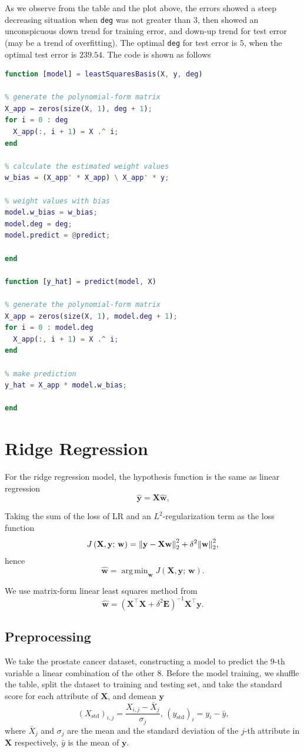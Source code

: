 \documentclass[10pt]{article}
\DeclareMathOperator*{\argmin}{arg\,min}
\begin{document}
As we observe from the table and the plot above, the errors showed a steep decreasing situation when \texttt{deg} was not greater than $3$, then showed an unconspicuous down trend for training error, and down-up trend for test error (may be a trend of overfitting). The optimal \texttt{deg} for test error is $5$, when the optimal test error is $239.54$. The code is shown as follows
\begin{lstlisting}[language=MATLAB]
function [model] = leastSquaresBasis(X, y, deg)

% generate the polynomial-form matrix
X_app = zeros(size(X, 1), deg + 1);
for i = 0 : deg
  X_app(:, i + 1) = X .^ i;
end

% calculate the estimated weight values
w_bias = (X_app' * X_app) \ X_app' * y;

% weight values with bias
model.w_bias = w_bias;
model.deg = deg;
model.predict = @predict;

end

function [y_hat] = predict(model, X)

% generate the polynomial-form matrix
X_app = zeros(size(X, 1), model.deg + 1);
for i = 0 : model.deg
  X_app(:, i + 1) = X .^ i;
end

% make prediction
y_hat = X_app * model.w_bias;

end
\end{lstlisting}
\clearpage

\section{Ridge Regression}
For the ridge regression model, the hypothesis function is the same as linear regression
$$\hat{\mathbf{y}} = \mathbf{X}\hat{\mathbf{w}}\text{,}$$\par
Taking the sum of the loss of LR and an $L^2$-regularization term as the loss function
$$J\left(\mathbf{X},\mathbf{y};\, \mathbf{w}\right) = \norm{\mathbf{y} - \mathbf{X}\mathbf{w}}_2^2 + \delta^2\norm{\mathbf{w}}_2^2\text{,}$$
hence
$$\hat{\mathbf{w}} = \argmin_{\mathbf{w}}J\left(\mathbf{X},\mathbf{y};\, \mathbf{w}\right)\text{.}$$\par
We use matrix-form linear least squares method from \cite{shumway2010time}
$$\hat{\mathbf{w}} = \left(\mathbf{X}^\intercal\mathbf{X} + \delta^2\mathbf{E}\right)^{-1}\mathbf{X}^\intercal\mathbf{y}\text{.}$$
\subsection{Preprocessing}
We take the prostate cancer dataset, constructing a model to predict the $9$-th variable a linear combination of the other $8$. Before the model training, we shuffle the table, split the dataset to training and testing set, and take the standard score for each attribute of $\mathbf{X}$, and demean $\mathbf{y}$
$$\left(X_{\text{std}}\right)_{i,j} = \frac{X_{i,j} - \bar{X}_j}{\sigma_j},\, \left(y_{\text{std}}\right)_i = y_i - \bar{y}\text{,}$$
where $\bar{X}_j$ and $\sigma_j$ are the mean and the standard deviation of the $j$-th attribute in $\mathbf{X}$ respectively, $\bar{y}$ is the mean of $\mathbf{y}$.
\end{document}
